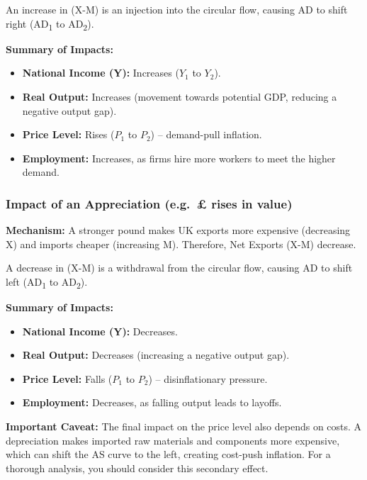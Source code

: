 \documentclass[11pt, a4paper, twoside]{book}
\begin{document}
An increase in (X-M) is an injection into the circular flow, causing AD to shift right (AD\textsubscript{1} to AD\textsubscript{2}).

\textbf{Summary of Impacts:}
\begin{itemize}
  \item \textbf{National Income (Y):} Increases ($Y_1$ to $Y_2$).
  \item \textbf{Real Output:} Increases (movement towards potential GDP, reducing a negative output gap).
  \item \textbf{Price Level:} Rises ($P_1$ to $P_2$) -- demand-pull inflation.
  \item \textbf{Employment:} Increases, as firms hire more workers to meet the higher demand.
\end{itemize}

\subsubsection{Impact of an Appreciation (e.g.\ £ rises in value)}

\textbf{Mechanism:} A stronger pound makes UK exports more expensive (decreasing X) and imports cheaper (increasing M). Therefore, Net Exports (X-M) decrease.

A decrease in (X-M) is a withdrawal from the circular flow, causing AD to shift left (AD\textsubscript{1} to AD\textsubscript{2}).

\textbf{Summary of Impacts:}
\begin{itemize}
  \item \textbf{National Income (Y):} Decreases.
  \item \textbf{Real Output:} Decreases (increasing a negative output gap).
  \item \textbf{Price Level:} Falls ($P_1$ to $P_2$) -- disinflationary pressure.
  \item \textbf{Employment:} Decreases, as falling output leads to layoffs.
\end{itemize}

\begin{coreidea}
\textbf{Important Caveat:} The final impact on the price level also depends on costs. A depreciation makes imported raw materials and components more expensive, which can shift the AS curve to the left, creating cost-push inflation. For a thorough analysis, you should consider this secondary effect.
\end{coreidea}
\end{document}
